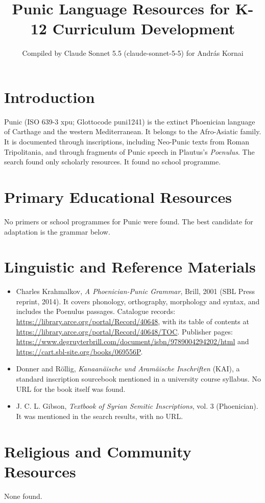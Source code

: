 \documentclass[12pt]{article}
\title{Punic Language Resources for K-12 Curriculum Development}
\author{Compiled by Claude Sonnet 5.5 (claude-sonnet-5-5) for Andr\'as Kornai}
\date{}
\begin{document}
\maketitle

\section{Introduction}
Punic (ISO 639-3 xpu; Glottocode puni1241) is the extinct Phoenician language of Carthage and the western Mediterranean. It belongs to the Afro-Asiatic family. It is documented through inscriptions, including Neo-Punic texts from Roman Tripolitania, and through fragments of Punic speech in Plautus's \emph{Poenulus}. The search found only scholarly resources. It found no school programme.

\section{Primary Educational Resources}
No primers or school programmes for Punic were found. The best candidate for adaptation is the grammar below.

\section{Linguistic and Reference Materials}
\begin{itemize}
\item Charles Krahmalkov, \emph{A Phoenician-Punic Grammar}, Brill, 2001 (SBL Press reprint, 2014). It covers phonology, orthography, morphology and syntax, and includes the Poenulus passages. Catalogue records: \url{https://library.arce.org/portal/Record/40648}, with its table of contents at \url{https://library.arce.org/portal/Record/40648/TOC}. Publisher pages: \url{https://www.degruyterbrill.com/document/isbn/9789004294202/html} and \url{https://cart.sbl-site.org/books/069556P}.
\item Donner and R\"ollig, \emph{Kanaan\"aische und Aram\"aische Inschriften} (KAI), a standard inscription sourcebook mentioned in a university course syllabus. No URL for the book itself was found.
\item J. C. L. Gibson, \emph{Textbook of Syrian Semitic Inscriptions}, vol. 3 (Phoenician). It was mentioned in the search results, with no URL.
\end{itemize}

\section{Religious and Community Resources}
None found.
\end{document}
